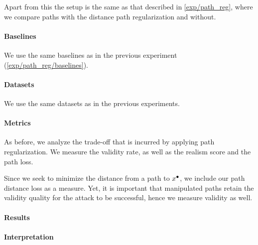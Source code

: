 \documentclass[../main.tex]{subfiles}
\begin{document}
Apart from this the setup is the same as that described in \autoref{exp/path_reg}, where we compare paths with the distance path regularization and without.

\paragraph{Baselines}

We use the same baselines as in the previous experiment (\autoref{exp/path_reg/baselines}).

\paragraph{Datasets}

We use the same datasets as in the previous experiments.

\paragraph{Metrics}

As before, we analyze the trade-off that is incurred by applying path regularization.
We measure the validity rate, as well as the realism score and the path loss.

Since we seek to minimize the distance from a path to $x^\bullet$, we  include our path distance loss as a measure.
Yet, it is important that manipulated paths retain the validity quality for the attack to be successful, hence we measure validity as well.

\paragraph{Results}

\paragraph{Interpretation}
\end{document}
